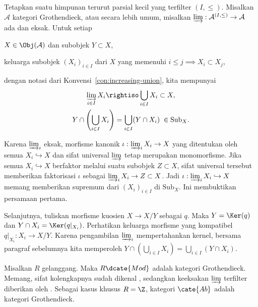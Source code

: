 \begin{proposisi}\label{prop:Grothendieck-cat-intersection}
Tetapkan suatu himpunan terurut parsial kecil yang terfilter $(I,\leq)$.
Misalkan $\mathcal{A}$ kategori Grothendieck, atau secara lebih umum, misalkan
$\varinjlim:\mathcal{A}^{(I,\leq)}\to\mathcal{A}$ ada dan eksak. Untuk setiap
\begin{compactitem}
	\item $X\in\Obj(\mathcal{A})$ dan subobjek $Y\subset X$,
	\item keluarga subobjek $\left(X_i\right)_{i\in I}$ dari $X$ yang memenuhi
	$i\leq j\implies X_i\subset X_j$,
\end{compactitem}
dengan notasi dari Konvensi~\ref{con:increasing-union}, kita mempunyai
\begin{gather*}
	\varinjlim_{i\in I}X_i\rightiso\bigcup_{i\in I}X_i\subset X,\\
	Y\cap\left(\bigcup_{i\in I}X_i\right)
	=\bigcup_{i\in I}(Y\cap X_i)\;\in\mathrm{Sub}_X.
\end{gather*}
\end{proposisi}
\begin{bukti}
Karena $\varinjlim_i$ eksak, morfisme kanonik
$\iota:\varinjlim_iX_i\to X$ yang ditentukan oleh semua
$X_i\hookrightarrow X$ dan sifat universal $\varinjlim$ tetap merupakan
monomorfisme. Jika semua $X_i\hookrightarrow X$ berfaktor melalui suatu
subobjek $Z\subset X$, sifat universal tersebut memberikan faktorisasi $\iota$ sebagai
$\varinjlim_iX_i\to Z\subset X$. Jadi
$\iota:\varinjlim_iX_i\hookrightarrow X$ memang memberikan supremum dari
$(X_i)_{i\in I}$ di $\mathrm{Sub}_X$. Ini membuktikan persamaan pertama.

Selanjutnya, tuliskan morfisme kuosien $X\to X/Y$ sebagai $q$. Maka
$Y=\Ker(q)$ dan $Y\cap X_i=\Ker(q|_{X_i})$. Perhatikan keluarga morfisme yang
kompatibel $q|_{X_i}:X_i\to X/Y$. Karena pengambilan $\varinjlim_i$
mempertahankan kernel, bersama paragraf sebelumnya kita memperoleh
$Y\cap\left(\bigcup_{i\in I}X_i\right)=
\bigcup_{i\in I}(Y\cap X_i)$.
\end{bukti}

\begin{contoh}
Misalkan $R$ gelanggang. Maka $R\dcate{Mod}$ adalah kategori Grothendieck.
Memang, sifat kolengkapnya sudah dikenal \cite[Teorema 6.2.2]{Li1}, sedangkan
keeksakan $\varinjlim$ terfilter diberikan oleh
\cite[Lema 6.8.3]{Li1}. Sebagai kasus khusus $R=\Z$, kategori $\cate{Ab}$
adalah kategori Grothendieck.
\end{contoh}

